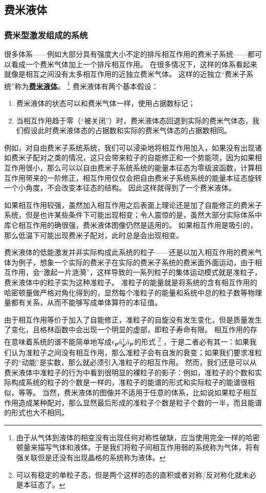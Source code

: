 \documentclass[hyperref, UTF8, a4paper]{ctexart}
\newcommand{\concept}[1]{\underline{\textbf{#1}}}
\begin{document}
\subsection{费米液体}

\subsubsection{费米型激发组成的系统}


很多体系——例如大部分具有强度大小不定的排斥相互作用的费米子系统——都可以看成一个费米气体加上一个排斥相互作用。
在很多情况下，这样的体系看起来就像是相互之间没有太多相互作用的近独立费米气体。
这样的近独立“费米子系统”称为\concept{费米液体}。%
\footnote{由于从气体到液体的相变没有出现任何对称性破缺，应当使用完全一样的哈密顿量来描写气体和液体。于是我们将粒子间相互作用弱的系统称为气体，将有强关联但是还没有出现晶格的系统称为液体。
}%
费米液体有两个基本假设：
\begin{enumerate}
    \item 费米液体的状态可以和费米气体一样，使用占据数标记；
    \item 当相互作用趋于零（“被关闭”）时，费米液体态回退到实际的费米气体态，我们假设此时费米液体态的占据数和实际的费米气体态的占据数相同。
\end{enumerate}
例如，对自由费米子系统系统，我们可以浸染地将相互作用加入，如果没有出现诸如费米子配对之类的情况，这只会带来粒子的自能修正和一个势能项，因为如果相互作用很小，那么可以以自由费米子系统系统的能量本征态为零级波函数，计算相互作用带来的一阶修正，相互作用仅仅会把自由费米子系统系统的能量本征态旋转一个小角度，不会改变本征态的结构。
因此这样就得到了一个费米液体。

如果相互作用较强，虽然加入相互作用之后表面上理论还是加了自能修正的费米子系统，但是也许某些条件下可能出现相变；令人震惊的是，虽然大部分实际体系中库仑相互作用的确很强，费米液体图像仍然是适用的。
如果相互作用是吸引的，那么低温下可能出现费米子配对，此时总是会出现相变。

费米液体的低能激发并非实际构成此系统的粒子——还是以加入相互作用的费米气体为例子，想象一个实际的费米子在实际的费米子系统的费米面外面运动，由于相互作用，会“激起一片涟漪”，这样导致的一系列粒子的集体运动模式就是准粒子，费米液体中的粒子实为这种准粒子。
准粒子的能量就是将系统的含有相互作用的哈密顿量做严格对角化得到的，显然每个准粒子的能量和系统中总的粒子数等物理量都有关系，从而不能够写成单体算符的本征值。

由于相互作用等价于加入了自能修正，准粒子的自旋没有发生变化，但是质量发生了变化，且格林函数中会出现一个明显的虚部，即粒子寿命有限。
相互作用的存在意味着系统的谱不能简单地写成$\epsilon_{\vb*{p}} \hat{a}^\dagger_{\vb*{p}} \hat{a}_{\vb*{p}}$的形式%
\footnote{
    可以有稳定的单粒子态，但是两个这样的态的直积或者对称/反对称化就未必是本征态了。
}%
，于是二者必有其一：如果我们认为准粒子之间没有相互作用，那么准粒子会有自发的衰变；如果我们要求准粒子的“动能”是实数，那么就必须引入准粒子的相互作用。
然而，我们还是可以从费米液体中准粒子的行为中看到很明显的裸粒子的影子：例如，准粒子的个数和实际构成系统的粒子的个数是一样的，准粒子的能谱的形式和实际粒子的能谱很相似，等等。
当然，费米液体的图像并不适用于任意的体系，比如说如果粒子相互作用造成某种配对，那么显然最后形成的准粒子个数是粒子个数的一半，而且能谱的形式也大不相同。
\end{document}
